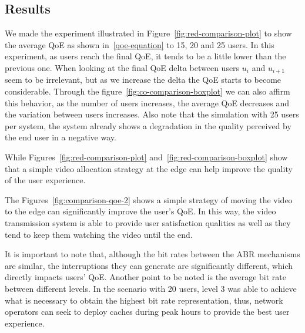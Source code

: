 

\subsection{Results}

We made the experiment illustrated in Figure~\ref{fig:red-comparison-plot} to show the average QoE as shown in~\ref{qoe-equation} to 15, 20 and 25 users. In this experiment, as users reach the final QoE, it tends to be a little lower than the previous one. When looking at the final QoE delta between users $u_{i}$ and $u_{i + 1}$ seem to be irrelevant, but as we increase the delta the QoE starts to become considerable. Through the figure~\ref{fig:co-comparison-boxplot} we can also affirm this behavior, as the number of users increases, the average QoE decreases and the variation between users increases. Also note that the simulation with 25 users per system, the system already shows a degradation in the quality perceived by the end user in a negative way.

While Figures~\ref{fig:red-comparison-plot} and~\ref{fig:red-comparison-boxplot} show that a simple video allocation strategy at the edge can help improve the quality of the user experience.

The Figures~\ref{fig:comparison-qoe-2} shows a simple strategy of moving the video to the edge can significantly improve the user's QoE. In this way, the video transmission system is able to provide user satisfaction qualities as well as they tend to keep them watching the video until the end. 

It is important to note that, although the bit rates between the ABR mechanisms are similar, the interruptions they can generate are significantly different, which directly impacts users' QoE. Another point to be noted is the average bit rate between different levels. In the scenario with 20 users, level 3 was able to achieve what is necessary to obtain the highest bit rate representation, thus, network operators can seek to deploy caches during peak hours to provide the best user experience.